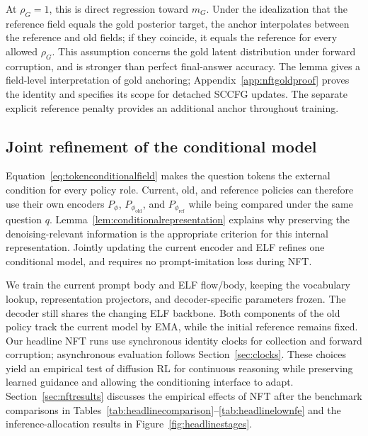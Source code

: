 At $\rho_G=1$, this is direct regression toward $m_G$. Under the idealization that the reference field equals the gold posterior target, the anchor interpolates between the reference and old fields; if they coincide, it equals the reference for every allowed $\rho_G$. This assumption concerns the gold latent distribution under forward corruption, and is stronger than perfect final-answer accuracy. The lemma gives a field-level interpretation of gold anchoring; Appendix~\ref{app:nftgoldproof} proves the identity and specifies its scope for detached SCCFG updates. The separate explicit reference penalty provides an additional anchor throughout training.

\subsection{Joint refinement of the conditional model}
\label{sec:nftjoint}

Equation~\eqref{eq:tokenconditionalfield} makes the question tokens the external condition for every policy role. Current, old, and reference policies can therefore use their own encoders $P_\phi$, $P_{\phi_{\mathrm{old}}}$, and $P_{\phi_{\mathrm{ref}}}$ while being compared under the same question $q$. Lemma~\ref{lem:conditionalrepresentation} explains why preserving the denoising-relevant information is the appropriate criterion for this internal representation. Jointly updating the current encoder and ELF refines one conditional model, and requires no prompt-imitation loss during NFT.

We train the current prompt body and ELF flow/body, keeping the vocabulary lookup, representation projectors, and decoder-specific parameters frozen. The decoder still shares the changing ELF backbone. Both components of the old policy track the current model by EMA, while the initial reference remains fixed. Our headline NFT runs use synchronous identity clocks for collection and forward corruption; asynchronous evaluation follows Section~\ref{sec:clocks}. These choices yield an empirical test of diffusion RL for continuous reasoning while preserving learned guidance and allowing the conditioning interface to adapt. Section~\ref{sec:nftresults} discusses the empirical effects of NFT after the benchmark comparisons in Tables~\ref{tab:headlinecomparison}--\ref{tab:headlinelownfe} and the inference-allocation results in Figure~\ref{fig:headlinestages}.
